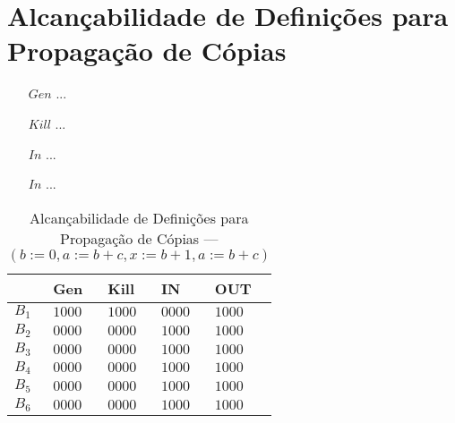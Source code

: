 \section{Alcan\c{c}abilidade de Defini\c{c}\~oes para Propaga\c{c}\~ao de C\'opias}

\begin{itemize}
  \item[$Gen$] ...
  \item[$Kill$] ...
  \item[$In$] ...
  \item[$In$] ...
\end{itemize}

\begin{table}[ht]
\centering
\begin{tabular}{l|l|l|l|l}
	& Gen & Kill & IN & OUT\\
\hline
$B_{1}$ &  $1000$ & $1000$ & $0000$ & $1000$\\
$B_{2}$ &  $0000$ & $0000$ & $1000$ & $1000$\\
$B_{3}$ &  $0000$ & $0000$ & $1000$ & $1000$\\
$B_{4}$ &  $0000$ & $0000$ & $1000$ & $1000$\\
$B_{5}$ &  $0000$ & $0000$ & $1000$ & $1000$\\
$B_{6}$ &  $0000$ & $0000$ & $1000$ & $1000$\\
\end{tabular}
\caption{Alcan\c{c}abilidade de Defini\c{c}\~oes para Propaga\c{c}\~ao de C\'opias --- $(b:=0, a:=b+c, x:=b+1, a:=b+c)$}
\end{table}

